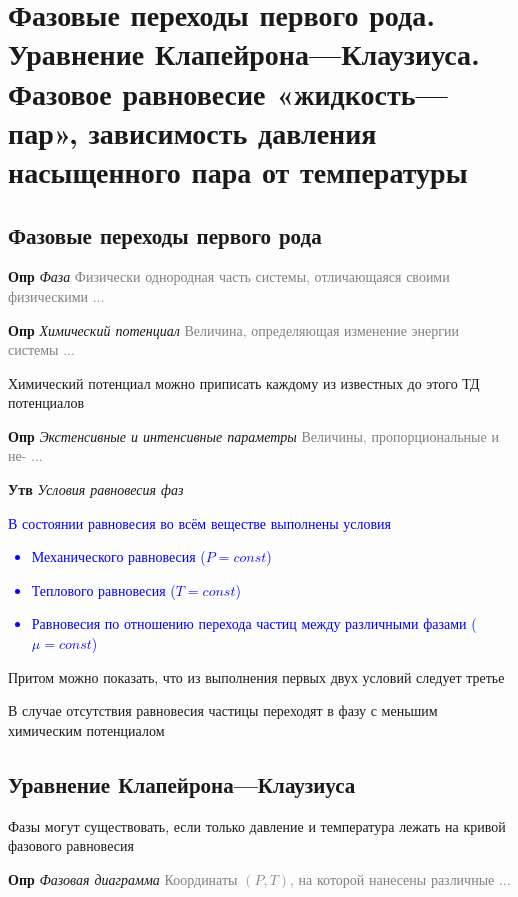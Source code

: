 \documentclass[a4paper, 14pt]{article}
\begin{document}
    \section{Фазовые переходы первого рода.
    Уравнение Клапейрона—Клаузиуса.
    Фазовое равновесие «жидкость—пар», зависимость давления насыщенного пара от температуры}

    \subsection{Фазовые переходы первого рода}

    \textbf{Опр} \textit{Фаза} \textcolor{gray}{Физически однородная часть системы, отличающаяся своими физическими ...}

    \textbf{Опр} \textit{Химический потенциал} \textcolor{gray}{Величина, определяющая изменение энергии системы ...}

    Химический потенциал можно приписать каждому из известных до этого ТД потенциалов

    \textbf{Опр} \textit{Экстенсивные и интенсивные параметры} \textcolor{gray}{Величины, пропорциональные и не- ...}

    \textbf{Утв} \textit{Условия равновесия фаз}

    \textcolor{blue}{В состоянии равновесия во всём веществе выполнены условия
        \begin{itemize}
            \item Механического равновесия ($P = const$)
            \item Теплового равновесия ($T = const$)
            \item Равновесия по отношению перехода частиц между различными фазами ($\mu = const$)
        \end{itemize}}

    Притом можно показать, что из выполнения первых двух условий следует третье

    В случае отсутствия равновесия частицы переходят в фазу с меньшим химическим потенциалом

    \subsection{Уравнение Клапейрона—Клаузиуса}

    Фазы могут существовать, если только давление и температура лежать на кривой фазового равновесия

    \textbf{Опр} \textit{Фазовая диаграмма} \textcolor{gray}{Координаты $(P, T)$, на которой нанесены различные ...}
\end{document}
